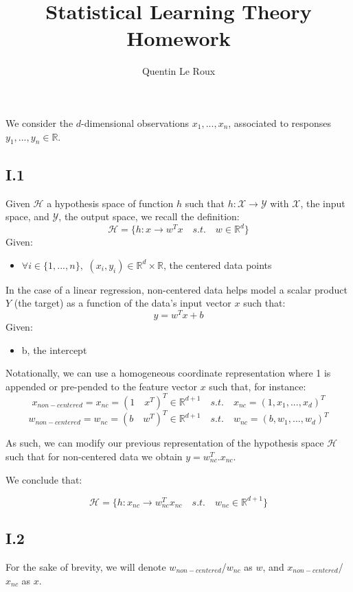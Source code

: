 \documentclass{homework}
\title{Statistical Learning Theory Homework}
\author{Quentin Le Roux}
\begin{document}
\maketitle


We consider the $d$-dimensional observations $x_1, ..., x_n$, associated to responses $y_1,...,y_n\in\mathbb{R}$.

\subsection*{I.1}
Given $\mathcal{H}$ a hypothesis space of function $h$ such that $h:\mathcal{X} \rightarrow \mathcal{Y}$ with $\mathcal{X}$, the input space, 
and $\mathcal{Y}$, the output space, we recall the definition:
$$\mathcal{H} = \{h:x\rightarrow w^Tx \quad{s.t.}\quad w\in\mathbb{R}^{d}\}$$ 
Given:
\begin{itemize}
    \item $\forall i \in \{1, ..., n\},\,\, (x_i, y_i) \in \mathbb{R}^d \times \mathbb{R}$, the centered data points
\end{itemize}
In the case of a linear regression, non-centered data helps model a scalar product $Y$ (the target) as a 
function of the data's input vector $x$ such that:
$$y=w^Tx+b$$ 
Given:
\begin{itemize}
    \item b,  the intercept
\end{itemize}
Notationally, we can use a homogeneous coordinate representation where 1 is appended or pre-pended 
to the feature vector $x$ such that, for instance:
$$x_{non-centered}=x_{nc}=(1\quad x^T)^T \in \mathbb{R}^{d+1}\quad{s.t.}\quad x_{nc}=(1, x_1, ..., x_d)^T$$
$$w_{non-centered}=w_{nc}=(b\quad w^T)^T \in \mathbb{R}^{d+1}\quad{s.t.}\quad w_{nc}=(b, w_1, ..., w_d)^T$$

As such, we can modify our previous representation of the hypothesis space $\mathcal{H}$ 
such that for non-centered data we obtain $y=w_{nc}^T.x_{nc}$.

We conclude that: 

\textcolor{OliveGreen}{$$\mathcal{H} = \{h:x_{nc}\rightarrow w_{nc}^Tx_{nc} \quad{s.t.}\quad w_{nc}\in\mathbb{R}^{d+1}\}$$}

\subsection*{I.2}
For the sake of brevity, we will denote $w_{non-centered}$/$w_{nc}$ as $w$, and $x_{non-centered}$/$x_{nc}$ as $x$.
\end{document}
